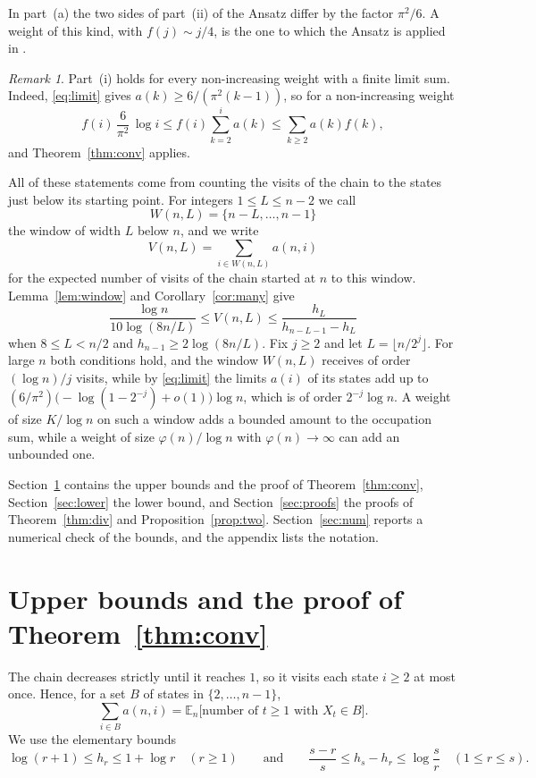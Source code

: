 \documentclass[11pt]{amsart}
\theoremstyle{remark}
\newtheorem{remark}[theorem]{Remark}
\numberwithin{equation}{section}
\newcommand{\E}{\mathbb{E}}
\begin{document}
In part~(a) the two sides of part~(ii) of the Ansatz differ by the factor $\pi^2/6$. A weight of this kind, with
$f(j)\sim j/4$, is the one to which the Ansatz is applied in \cite[Section~4.9.2]{AJ}.

\begin{remark}\label{rem:monotone}
Part~(i) holds for every non-increasing weight with a finite limit sum. Indeed, \eqref{eq:limit} gives
$a(k)\ge6/(\pi^2(k-1))$, so for a non-increasing weight
\[
f(i)\,\frac{6}{\pi^2}\,\log i\le f(i)\sum_{k=2}^{i}a(k)\le\sum_{k\ge2}a(k)f(k),
\]
and Theorem~\ref{thm:conv} applies.
\end{remark}

All of these statements come from counting the visits of the chain to the states just below its starting point. For
integers $1\le L\le n-2$ we call
\[
W(n,L)=\{n-L,\dots,n-1\}
\]
the window of width $L$ below $n$, and we write
\begin{equation}\label{eq:V}
V(n,L)=\sum_{i\in W(n,L)}a(n,i)
\end{equation}
for the expected number of visits of the chain started at $n$ to this window. Lemma~\ref{lem:window} and
Corollary~\ref{cor:many} give
\[
\frac{\log n}{10\log(8n/L)}\le V(n,L)\le\frac{h_L}{h_{n-L-1}-h_L}
\]
when $8\le L<n/2$ and $h_{n-1}\ge2\log(8n/L)$. Fix $j\ge2$ and let $L=\lfloor n/2^{j}\rfloor$. For large $n$ both
conditions hold, and the window $W(n,L)$ receives of order $(\log n)/j$ visits, while by \eqref{eq:limit} the limits
$a(i)$ of its states add up to $(6/\pi^2)\bigl(-\log(1-2^{-j})+o(1)\bigr)\log n$, which is of order $2^{-j}\log n$. A weight of
size $K/\log n$ on such a window adds a bounded amount to the occupation sum, while a weight of size
$\varphi(n)/\log n$ with $\varphi(n)\to\infty$ can add an unbounded one.

Section~\ref{sec:upper} contains the upper bounds and the proof of Theorem~\ref{thm:conv}, Section~\ref{sec:lower} the
lower bound, and Section~\ref{sec:proofs} the proofs of Theorem~\ref{thm:div} and Proposition~\ref{prop:two}.
Section~\ref{sec:num} reports a numerical check of the bounds, and the appendix lists the notation.

\section{Upper bounds and the proof of Theorem~\ref{thm:conv}}\label{sec:upper}

The chain decreases strictly until it reaches $1$, so it visits each state $i\ge2$ at most once. Hence, for a set $B$ of
states in $\{2,\dots,n-1\}$,
\begin{equation}\label{eq:visits}
\sum_{i\in B}a(n,i)=\E_n\bigl[\text{number of }t\ge1\text{ with }X_t\in B\bigr].
\end{equation}
We use the elementary bounds
\begin{equation}\label{eq:harm}
\log(r+1)\le h_r\le1+\log r\quad(r\ge1)\qquad\text{and}\qquad\frac{s-r}{s}\le h_s-h_r\le\log\frac{s}{r}\quad(1\le r\le s).
\end{equation}
\end{document}
